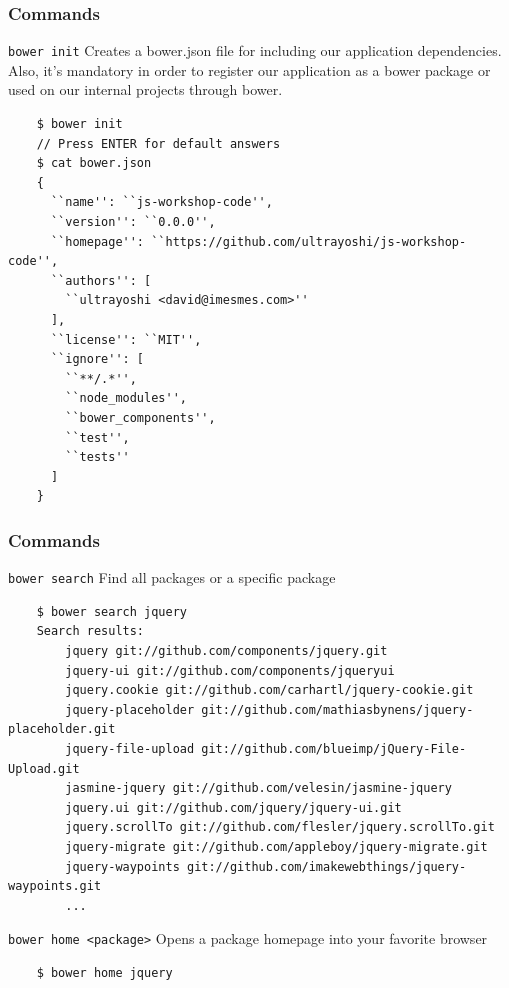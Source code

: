 \begin{frame}[fragile]
  \frametitle{Commands}

  \begin{block}{\texttt{bower init}}
    Creates a bower.json file for including our application dependencies. Also, it's mandatory in order to register our application as a bower package or used on our internal projects through bower.
    {\tiny
    \begin{verbatim}
    $ bower init
    // Press ENTER for default answers
    $ cat bower.json
    {
      ``name'': ``js-workshop-code'',
      ``version'': ``0.0.0'',
      ``homepage'': ``https://github.com/ultrayoshi/js-workshop-code'',
      ``authors'': [
        ``ultrayoshi <david@imesmes.com>''
      ],
      ``license'': ``MIT'',
      ``ignore'': [
        ``**/.*'',
        ``node_modules'',
        ``bower_components'',
        ``test'',
        ``tests''
      ]
    }
    \end{verbatim}
    }
  \end{block}
\end{frame}

\begin{frame}[fragile]
  \frametitle{Commands}

  \begin{block}{\texttt{bower search}}
    Find all packages or a specific package
    {\tiny
    \begin{verbatim}
    $ bower search jquery
    Search results:
        jquery git://github.com/components/jquery.git
        jquery-ui git://github.com/components/jqueryui
        jquery.cookie git://github.com/carhartl/jquery-cookie.git
        jquery-placeholder git://github.com/mathiasbynens/jquery-placeholder.git
        jquery-file-upload git://github.com/blueimp/jQuery-File-Upload.git
        jasmine-jquery git://github.com/velesin/jasmine-jquery
        jquery.ui git://github.com/jquery/jquery-ui.git
        jquery.scrollTo git://github.com/flesler/jquery.scrollTo.git
        jquery-migrate git://github.com/appleboy/jquery-migrate.git
        jquery-waypoints git://github.com/imakewebthings/jquery-waypoints.git
        ...
    \end{verbatim}
    }
  \end{block}

  \pause

  \begin{block}{\texttt{bower home <package>}}
    Opens a package homepage into your favorite browser
    {\tiny
    \begin{verbatim}
    $ bower home jquery
    \end{verbatim}
    }
  \end{block}
\end{frame}

